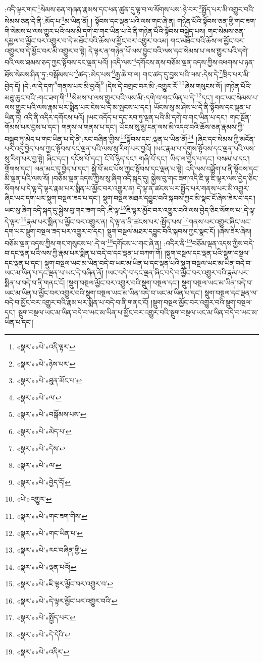:འདི་ལྟར་གང་\footnote{«སྣར་»«པེ་»འདི་ལྟར་}སེམས་ཅན་གཞན་རྣམས་དང་ཕན་ཚུན་དུ་ལྟ་བ་ལ་སོགས་པས་:ཉེ་བར་\footnote{«སྣར་»«པེ་»ཉེས་པར་}སྤྱོད་པར་མི་འགྱུར་བའི་སེམས་ཅན་དེ་ནི་:མོད་པ་\footnote{«སྣར་»«པེ་»ཐུན་མོང་པ་}མ་ཡིན་ནོ། །
སྟོབས་དང་ལྡན་པའི་ལས་གང་ཞེ་ན། གཉེན་པོའི་སྟོབས་ཅན་གྱི་གང་ཟག་གི་སེམས་པ་ལས་གྱུར་པའི་ལས་མི་དགེ་བ་གང་ཡིན་པ་དེ་ནི་གཉེན་པོའི་སྟོབས་བསྐྱེད་པས། གང་སེམས་ཅན་དམྱལ་བ་མྱོང་བར་འགྱུར་བ་དེ་མཐོང་བའི་ཆོས་ལ་མྱོང་བར་འགྱུར་བའམ། གང་མཐོང་བའི་ཆོས་ལ་མྱོང་བར་འགྱུར་བ་དེ་མྱོང་བར་མི་འགྱུར་བ་སྟེ། དེ་ལྟར་ན་གཉེན་པོ་ལས་བྱུང་བའི་ལས་དང་སེམས་པ་ལས་གྱུར་པའི་དགེ་བའི་ལས་ཐམས་ཅད་ཀྱང་སྟོབས་དང་ལྡན་པའོ། །འདི་ལས་\footnote{«སྣར་»«པེ་»ལ་}དགོངས་ནས་བཅོམ་ལྡན་འདས་ཀྱིས་འཕགས་པ་ཉན་ཐོས་སེམས་ཤིན་ཏུ་:བསྒོམས་པ་\footnote{«སྣར་»«པེ་»བསྒོམས་པས་}ཚད་:མེད་པས་\footnote{«སྣར་»«པེ་»མེད་པ་}རྒྱ་ཆེ་བ་ལ། གང་ཚད་དུ་བྱས་པའི་ལས་:དེས་དེ་\footnote{«སྣར་»«པེ་»དེས་}ཁྲིད་པར་མི་བྱེད་དོ། །དེ་:ལ་དེ་དག་\footnote{«སྣར་»«པེ་»ལ་}གནས་པར་མི་བྱའོ།\footnote{«སྣར་»«པེ་»བྱེད་དོ།} །དེས་དེ་བགྲང་བར་མི་:འགྱུར་རོ་\footnote{«པེ་»འགྱུར་}ཞེས་གསུངས་སོ། །གཉེན་པོའི་མཐུ་ཆུང་བའི་:གང་ཟག་གི་\footnote{«སྣར་»«པེ་»གང་ཟག་གིས་}སེམས་པ་ལས་གྱུར་པའི་ལས་མི་:དགེ་བ་གང་ཡིན་པ་དེ་\footnote{«སྣར་»«པེ་»གང་ཡིན་པ་}དང་། གང་ཡང་སེམས་པ་ལས་གྱུར་པའི་ལས་རྣམ་པར་སྨིན་པར་ངེས་པ་དེ་མ་སྤངས་པ་དང་། ཡོངས་སུ་མ་ཤེས་པ་དེ་ནི་སྟོབས་དང་ལྡན་པ་ཡིན་ཏེ། འདི་ནི་འདིར་དགོངས་པའོ། །ཡང་འདོད་པ་དང་རབ་ཏུ་ལྡན་པའི་མི་དགེ་བ་གང་ཡིན་པ་དང་། གང་སྔོན་གོམས་པར་བྱས་པ་དང་། གནས་ལ་གནས་པ་དང་། ཡོངས་སུ་མྱ་ངན་ལས་མི་འདའ་བའི་ཆོས་ཅན་རྣམས་ཀྱི་བསྒྲུབ་ཏུ་མེད་པ་གང་ཡིན་པ་དེ་ནི་:རང་བཞིན་གྱིས་\footnote{«སྣར་»«པེ་»རང་བཞིན་གྱི་}སྟོབས་དང་:ལྡན་པ་ཡིན་ནོ།\footnote{«སྣར་»«པེ་»ལྡན་པའོ།} །ཞིང་དང་སེམས་ཀྱི་མངོན་པར་འདུ་བྱེད་པས་ཀྱང་སྟོབས་དང་ལྡན་པའི་ལས་སུ་རིག་པར་བྱའོ། །ཡང་རྣམ་པ་དགུས་སྟོབས་དང་ལྡན་པའི་ལས་སུ་རིག་པར་བྱ་སྟེ། ཞིང་དང་། དངོས་པོ་དང་། ངོ་བོ་ཉིད་དང་། གཞི་བོ་དང་། ཡིད་ལ་བྱེད་པ་དང་། བསམ་པ་དང་། གྲོགས་དང་། ལན་མང་དུ་བྱེད་པ་དང་། སྐྱེ་བོ་མང་པོས་ཀྱང་སྟོབས་དང་ལྡན་པ་སྟེ། འདི་ལས་བཟློག་པ་ནི་སྟོབས་དང་མི་ལྡན་པའི་ལས་སོ། །བཅོམ་ལྡན་འདས་ཀྱིས་སུ་ཞིག་འདི་སྐད་དུ། སྐྱེས་བུ་གང་ཟག་འདི་ཇི་ལྟ་ཇི་ལྟར་ལས་བྱེད་ཅིང་སོགས་པ་དེ་ལྟ་དེ་ལྟར་རྣམ་པར་སྨིན་པ་མྱོང་བར་འགྱུར་ན། དེ་ལྟ་ན་ཚངས་པར་སྤྱོད་པར་གནས་པར་མི་འགྱུར་ཞིང་ཡང་དག་པར་སྡུག་བསྔལ་ཟད་པ་དང་། སྡུག་བསྔལ་མཐར་དབྱུང་བའི་སྐབས་ཀྱང་མི་སྣང་ངོ་ཞེས་ཟེར་བ་དང་། ཡང་སུ་ཞིག་འདི་སྐད་དུ་སྐྱེས་བུ་གང་ཟག་འདི་:ཇི་ལྟ་\footnote{«སྣར་»«པེ་»ཇི་ལྟར་མྱོང་བར་འགྱུར་བ་}ཇི་ལྟར་མྱོང་བར་འགྱུར་བའི་ལས་བྱེད་ཅིང་སོགས་པ་:དེ་ལྟ་དེ་ལྟར་\footnote{«སྣར་»«པེ་»དེ་ལྟར་མྱོང་པར་འགྱུར་བའི་}རྣམ་པར་སྨིན་པ་མྱོང་བར་འགྱུར་ན། དེ་ལྟ་ན་ནི་ཚངས་པར་:སྤྱོད་པས་\footnote{«སྣར་»«པེ་»སྤྱོད་པར་}གནས་པར་འགྱུར་ཞིང་ཡང་དག་པར་སྡུག་བསྔལ་ཟད་པར་འགྱུར་བ་དང་། སྡུག་བསྔལ་མཐར་དབྱུང་བའི་སྐབས་ཀྱང་སྣང་ངོ། །ཞེས་ཟེར་ཞེས། བཅོམ་ལྡན་འདས་ཀྱིས་གང་གསུངས་པ་:དེ་ལ་\footnote{«སྣར་»«པེ་»དེ་དེའི་}དགོངས་པ་གང་ཞེ་ན། :འདིར་ནི་\footnote{«སྣར་»«པེ་»འདིར་}བཅོམ་ལྡན་འདས་ཀྱིས་བདེ་བ་དང་ལྡན་པའི་ལས་ཀྱི་རྣམ་པར་སྨིན་པ་བདེ་བ་དང་ལྡན་པ་བཀག་གོ། །སྡུག་བསྔལ་དང་ལྡན་པའི་སྡུག་བསྔལ་དང་ལྡན་པ་དང་། སྡུག་བསྔལ་ཡང་མ་ཡིན་བདེ་བ་ཡང་མ་ཡིན་པ་དང་ལྡན་པའི་སྡུག་བསྔལ་ཡང་མ་ཡིན་བདེ་བ་ཡང་མ་ཡིན་པ་དང་ལྡན་པ་ཡང་དེ་བཞིན་ནོ། །ཡང་བདེ་བ་དང་ལྡན་ཞིང་བདེ་བ་མྱོང་བར་འགྱུར་བའི་རྣམ་པར་སྨིན་པ་བདེ་བ་ནི་གནང་ངོ། །སྡུག་བསྔལ་མྱོང་བར་འགྱུར་བའི་སྡུག་བསྔལ་དང་། སྡུག་བསྔལ་ཡང་མ་ཡིན་བདེ་བ་ཡང་མ་ཡིན་པ་མྱོང་བར་འགྱུར་བའི་སྡུག་བསྔལ་ཡང་མ་ཡིན་བདེ་བ་ཡང་མ་ཡིན་པ་དང་། སྡུག་བསྔལ་དང་ལྡན་ལ་བདེ་བ་མྱོང་བར་འགྱུར་བའི་རྣམ་པར་སྨིན་པ་བདེ་བ་ནི་གནང་ངོ། །སྡུག་བསྔལ་མྱོང་བར་འགྱུར་བའི་སྡུག་བསྔལ་དང་། སྡུག་བསྔལ་ཡང་མ་ཡིན་བདེ་བ་ཡང་མ་ཡིན་པ་མྱོང་བར་འགྱུར་བའི་སྡུག་བསྔལ་ཡང་མ་ཡིན་བདེ་བ་ཡང་མ་ཡིན་པ་དང་། 